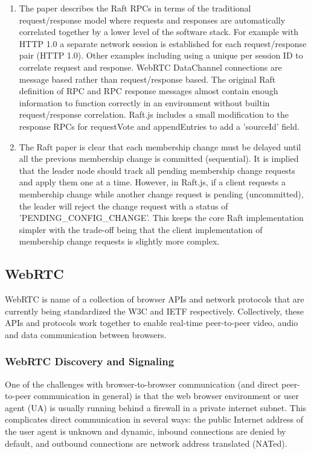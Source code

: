 \documentclass{acmtog} %
\begin{document}
\begin{enumerate}
\item The paper describes the Raft RPCs in terms of the traditional request/response model where requests and responses are automatically correlated together by a lower level of the software stack. For example with HTTP 1.0 a separate network session is established for each request/response pair (HTTP 1.0). Other examples including using a unique per session ID to correlate request and response.  WebRTC DataChannel connections are message based rather than request/response based. The original Raft definition of RPC and RPC response messages almost contain enough information to function correctly in an environment without builtin request/response correlation. Raft.js includes a small modification to the response RPCs for requestVote and appendEntries to add a 'sourceId' field.
\item The Raft paper is clear that each membership change must be delayed until all the previous membership change is committed (sequential).  It is implied that the leader node should track all pending membership change requests and apply them one at a time. However, in Raft.js, if a client requests a membership change while another change request is pending (uncommitted), the leader will reject the change request with a status of 'PENDING\_CONFIG\_CHANGE'. This keeps the core Raft implementation simpler with the trade-off being that the client implementation of membership change requests is slightly more complex.
\end{enumerate}

\subsection{WebRTC}

WebRTC is name of a collection of browser APIs and network protocols
that are currently being standardized the W3C and IETF respectively.
Collectively, these APIs and protocols work together to enable
real-time peer-to-peer video, audio and data communication between
browsers.

\subsubsection{WebRTC Discovery and Signaling}

One of the challenges with browser-to-browser communication (and
direct peer-to-peer communication in general) is that the web browser
environment or user agent (UA) is usually running behind a firewall in
a private internet subnet. This complicates direct communication in
several ways: the public Internet address of the user agent is unknown
and dynamic, inbound connections are denied by default, and outbound
connections are network address translated (NATed).
\end{document}
